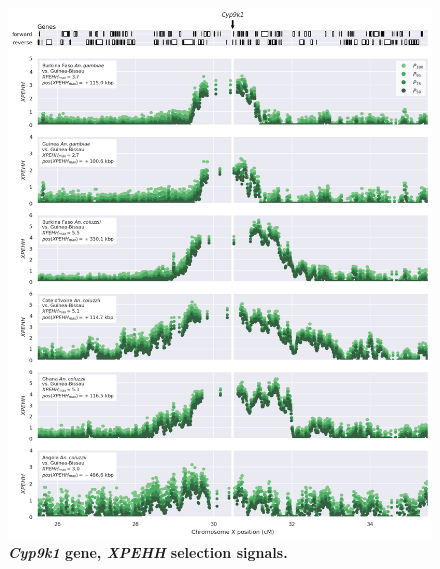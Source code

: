\documentclass[a4paper,11pt,abstracton,hidelinks]{scrartcl}
\begin{document}
\begin{figure}[t!]
	\begin{center}
		\includegraphics*[width=1.1\linewidth,center]{artwork/locus_cyp9k1_xpehh.png}
	\end{center}
	\caption[\textit{Cyp9k1} gene, \textit{XPEHH} selection signals]{
	\textbf{\textit{Cyp9k1} gene, \textit{XPEHH} selection signals.}
	} 
	\label{fig:locus_cyp9k1_xpehh}
\end{figure}


\clearpage
\end{document}

